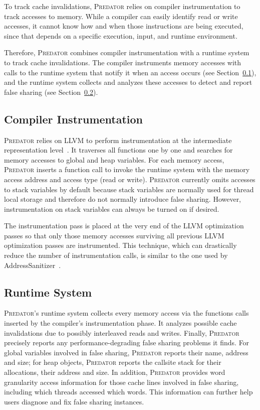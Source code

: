 \documentclass[10pt]{sigplanconf}
\newcommand{\Predator}{{\scshape Predator}}
\begin{document}

To track cache invalidations, \Predator{} relies on compiler instrumentation to track accesses to memory. While a compiler can easily identify read or write accesses, it cannot know how and when those instructions are being executed, since that depends on a specific execution, input, and runtime environment.

Therefore, \Predator{} combines compiler instrumentation with a runtime system to track cache invalidations. The compiler
instruments memory accesses with calls to the runtime system that notify it when an access occurs (see Section~\ref{sec:compiler}), and the runtime system collects and analyzes these accesses to detect and report false sharing (see Section~\ref{sec:runtime}).

\subsection{Compiler Instrumentation}
\label{sec:compiler}

\Predator{} relies on LLVM to perform instrumentation at the intermediate representation level~\cite{llvm}.
It traverses all functions one by one and searches for memory accesses to global and heap variables.  For each memory access, \Predator{} inserts a function call to invoke the runtime system with the memory access address and access type (read or write). \Predator{} currently omits accesses to stack variables by default because stack variables are normally used for thread local storage and therefore do not normally introduce false sharing. However, instrumentation on stack variables
can always be turned on if desired.

The instrumentation pass is placed at the very end of the LLVM
optimization passes so that only those memory accesses surviving all previous LLVM optimization passes are instrumented.  This technique, which can drastically reduce the number of instrumentation calls, is similar to the one used by AddressSanitizer~\cite{Addresssanitizer}.

\subsection{Runtime System}
\label{sec:runtime}

\Predator{}'s runtime system collects every memory access via the functions calls inserted by the compiler's instrumentation phase. It analyzes possible cache invalidations due to possibly interleaved reads and writes. Finally, \Predator{} precisely reports any performance-degrading false sharing problems it finds.  For global variables involved in false sharing, \Predator{} reports their name, address and size; for heap
objects, \Predator{} reports the callsite stack for their allocations, their address and size. In addition, \Predator{} provides word granularity access information for those cache lines involved in false sharing, including which threads accessed which words.  This information can further help users diagnose and fix false sharing instances.
\end{document}
